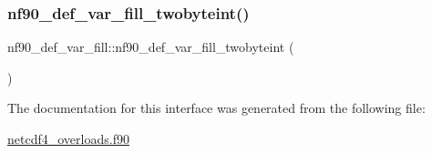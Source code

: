 \subsubsection{\texorpdfstring{nf90\+\_\+def\+\_\+var\+\_\+fill\+\_\+twobyteint()}{nf90\_def\_var\_fill\_twobyteint()}}
{\footnotesize\ttfamily nf90\+\_\+def\+\_\+var\+\_\+fill\+::nf90\+\_\+def\+\_\+var\+\_\+fill\+\_\+twobyteint (\begin{DoxyParamCaption}{ }\end{DoxyParamCaption})}



The documentation for this interface was generated from the following file\+:\begin{DoxyCompactItemize}
\item 
\hyperlink{netcdf4__overloads_8f90}{netcdf4\+\_\+overloads.\+f90}\end{DoxyCompactItemize}
